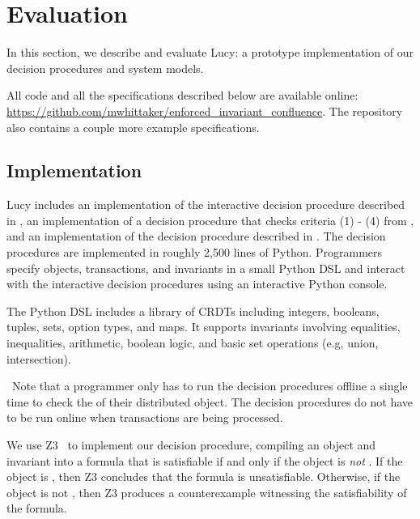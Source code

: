 \section{Evaluation}
In this section, we describe and evaluate Lucy: a prototype implementation of
our decision procedures and system models.
\begin{revisions}
  All code and all the specifications described below are available online:
  \url{https://github.com/mwhittaker/enforced_invariant_confluence}. The
  repository also contains a couple more example specifications.
\end{revisions}

\subsection{Implementation}
Lucy includes an implementation of the interactive decision procedure described
in , an implementation of a decision
procedure that checks criteria (1) - (4) from , and an
implementation of the decision procedure described in
. The decision procedures
are implemented in roughly 2,500 lines of Python. Programmers specify objects,
transactions, and invariants in a small Python DSL and interact with the
interactive decision procedures using an interactive Python console.
\begin{revisions}
  The Python DSL includes a library of CRDTs including integers, booleans,
  tuples, sets, option types, and maps. It supports invariants involving
  equalities, inequalities, arithmetic, boolean logic, and basic set operations
  (e.g, union, intersection).
\end{revisions}\
Note that a programmer only has to run the decision procedures offline a single
time to check the \invariantconfluence{} of their distributed object. The
decision procedures do not have to be run online when transactions are being
processed.

We use Z3~\cite{de2008z3} to implement our \invariantclosure{} decision
procedure, compiling an object and invariant into a formula that is satisfiable
if and only if the object is \emph{not} \invariantclosed{}. If the object is
\invariantclosed{}, then Z3 concludes that the formula is unsatisfiable.
Otherwise, if the object is not \invariantclosed{}, then Z3 produces a
counterexample witnessing the satisfiability of the formula.

